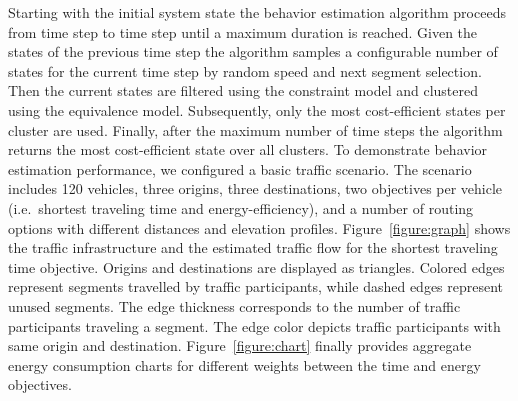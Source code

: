 \documentclass[conference]{../cls/IEEEtran}
\begin{document}
Starting with the initial system state the behavior estimation algorithm
proceeds from time step to time step until a maximum duration is reached. Given
the states of the previous time step the algorithm samples a configurable number of states for the current time step by random speed and next segment selection. Then the current states are filtered using the constraint model and clustered using the equivalence model. Subsequently, only the most cost-efficient states per cluster are used. Finally, after the maximum number of time steps the algorithm returns the most cost-efficient state over all clusters. To demonstrate behavior estimation performance, we configured a basic traffic scenario. The scenario includes 120 vehicles, three origins, three destinations, two objectives per vehicle (i.e.\ shortest traveling time and energy-efficiency), and a number of routing options with different distances and elevation profiles. Figure~\ref{figure:graph} shows the traffic infrastructure and the estimated traffic flow for the shortest traveling time objective. Origins and destinations are displayed as triangles. Colored edges represent segments travelled by traffic participants, while dashed edges represent unused segments. The edge thickness corresponds to the number of traffic participants traveling a segment. The edge color depicts traffic participants with same origin and destination. Figure~\ref{figure:chart} finally provides aggregate energy consumption charts for different weights between the time and energy objectives.

\end{document}
